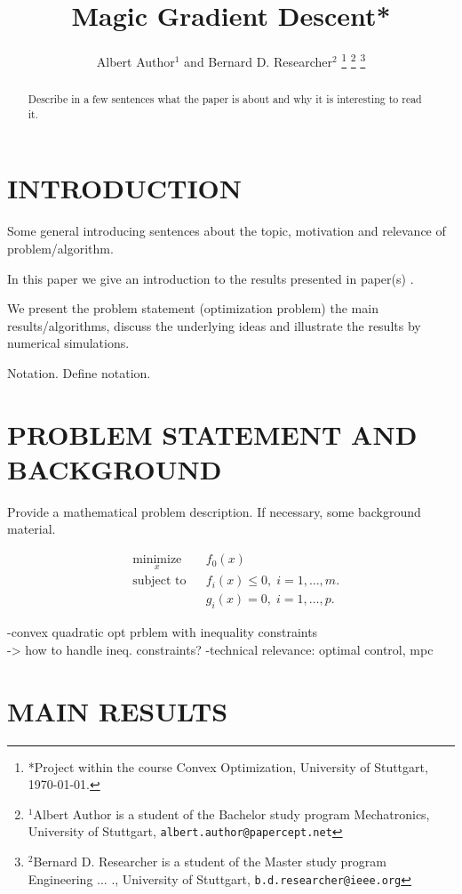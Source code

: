 \documentclass[letterpaper, 10 pt, conference]{ieeeconf}  %
\title{\LARGE \bf Magic Gradient Descent*}
\author{Albert Author$^{1}$ and Bernard D. Researcher$^{2}$%
\thanks{*Project within the course Convex Optimization, University of Stuttgart, \today.}%
\thanks{$^{1}$Albert Author is a student of the Bachelor study program Mechatronics, University of Stuttgart,
        {\tt\small albert.author@papercept.net}}%
\thanks{$^{2}$Bernard D. Researcher is a student of the Master study program Engineering ... ., University of Stuttgart,
        {\tt\small b.d.researcher@ieee.org}}%
}
\newcommand{\OptProblem}{
	\begin{aligned}
	& \underset{x}{\text{minimize}}
	& & f_0(x) \\
	& \text{subject to}
	& & f_i(x) \leq 0, \; i = 1, \ldots, m.\\
	& & &g_i(x) = 0, \; i = 1,\dots, p.
	\end{aligned}
	}
\begin{document}
\maketitle
\thispagestyle{empty}
\pagestyle{empty}


\begin{abstract}

Describe in a few sentences what the paper is about and why it is interesting 
to read it.

\end{abstract}


\section{INTRODUCTION}

Some general introducing sentences about the topic, motivation and relevance of problem/algorithm.

In this paper we give an introduction to the results presented in paper(s) \cite{Bro-14}.



We present the problem statement (optimization problem)
the main results/algorithms, discuss the underlying ideas and illustrate the results 
by numerical simulations.

Notation. Define notation.

\section{PROBLEM STATEMENT AND BACKGROUND}

Provide a mathematical problem description. If necessary, some background material.

\begin{equation}
\OptProblem
\label{eq:OptProblem}
\end{equation}

-convex quadratic opt prblem with inequality constraints\\
-> how to handle ineq. constraints?
-technical relevance: optimal control, mpc


\section{MAIN RESULTS}

\end{document}
